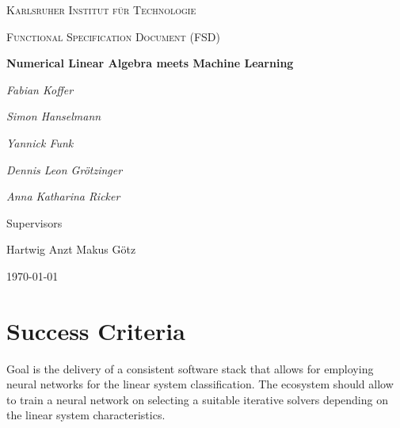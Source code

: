 \documentclass[parskip=full]{scrartcl}
\begin{document}
\begin{titlepage}
\centering
{\scshape\LARGE Karlsruher Institut für Technologie\par}
\vspace{1cm}
{\scshape\Large Functional Specification Document (FSD)\par}
\vspace{1.5cm}
{\huge\bfseries Numerical Linear Algebra meets Machine Learning \par}
\vspace {2cm}

{\Large\itshape Fabian Koffer\par}
{\Large\itshape Simon Hanselmann\par}
{\Large\itshape Yannick Funk\par}
{\Large\itshape Dennis Leon Gr\"{o}tzinger\par}
{\Large\itshape Anna Katharina Ricker\par}

\vfill
Supervisors\par
Hartwig Anzt
Makus G\"{o}tz

\vfill
{\large\today\par}
\end{titlepage}



\section{Success Criteria}

Goal is the delivery of a consistent software stack that allows for employing 
neural networks for the linear system classification. 
The ecosystem should allow to train a neural network on selecting a suitable \glspl{iterative solver} depending on the linear system characteristics.
\end{document}
